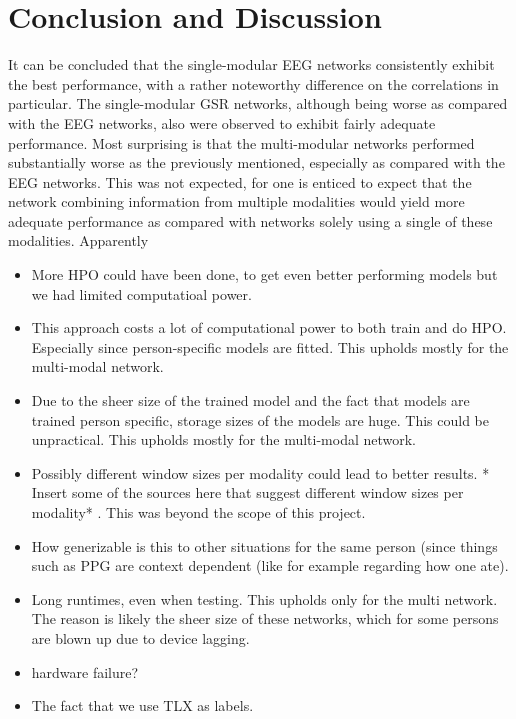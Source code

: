 \documentclass[12pt]{article}
\begin{document}
\section{Conclusion and Discussion}
It can be concluded that the single-modular EEG networks consistently exhibit the best performance,  with a rather noteworthy difference on the correlations in particular.  The single-modular GSR networks, although being worse as compared with the EEG networks, also were observed to exhibit fairly adequate performance.  Most surprising is that the multi-modular networks performed substantially worse as the previously mentioned, especially as compared with the EEG networks. This was not expected, for one is enticed to expect that the network combining information from multiple modalities would yield more adequate performance as compared with networks solely using a single of these modalities. Apparently  

\begin{itemize}
  \item  More HPO could have been done, to get even better performing models but we had limited computatioal power.   
  \item This approach costs a lot of computational power to both train and do HPO. Especially since person-specific models are fitted. This upholds mostly for the multi-modal network.
  \item Due to the sheer size of the trained model and the fact that models are trained person specific, storage sizes of the models are huge. This could be unpractical.  This upholds mostly for the multi-modal network.
  \item Possibly different window sizes per modality could lead to better results.  * Insert some of the sources here that suggest different window sizes per modality* . This was beyond the scope of this project.
   \item How generizable is this to other situations for the same person (since things such as PPG are context dependent (like for example regarding how one ate).
   \item Long runtimes,  even when testing. This upholds only for the multi network. The reason is likely the sheer size of these networks, which for some persons are blown up due to device lagging. 
   \item hardware failure?
   \item The fact that we use TLX as labels.
\end{itemize}





\newpage


\end{document}
